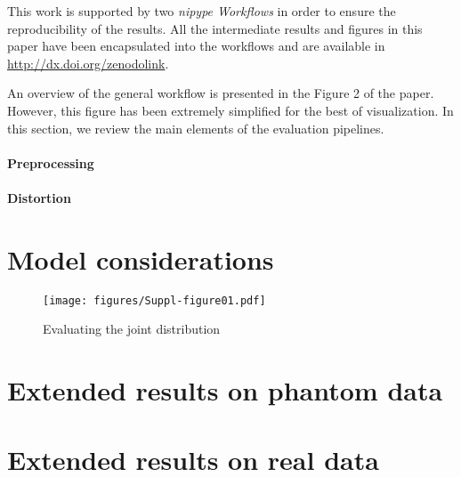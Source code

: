 \documentclass[a4paper]{report}
\begin{document}
This work is supported by two \emph{nipype Workflows} in order to ensure the reproducibility
  of the results.
All the intermediate results and figures in this paper have been encapsulated into
  the workflows and are available in \url{http://dx.doi.org/zenodolink}.

An overview of the general workflow is presented in the Figure 2 of the paper.
However, this figure has been extremely simplified for the best of visualization.
In this section, we review the main elements of the evaluation pipelines.

\paragraph{Preprocessing}

\paragraph{Distortion}

\section{Model considerations}

\begin{figure*}[!ht]
	\texttt{[image: figures/Suppl-figure01.pdf]}
	\caption{Evaluating the joint distribution}\label{fig:jointplot}
\end{figure*}

\section{Extended results on phantom data}

\newpage
\section{Extended results on real data}

\immediate{}

\end{document}
